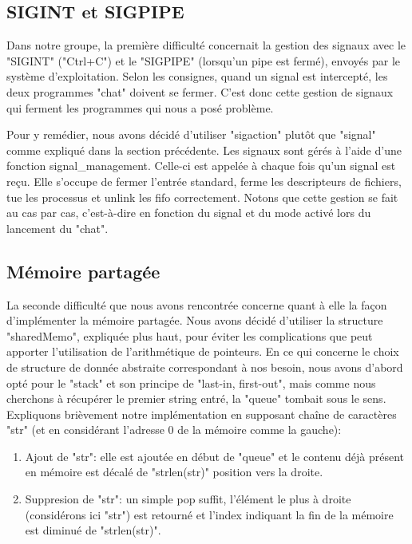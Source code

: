 \documentclass[utf8]{article}
\begin{document}
\subsection{SIGINT et SIGPIPE}
Dans notre groupe, la première difficulté concernait la gestion des signaux avec le "SIGINT" ("Ctrl+C") et le "SIGPIPE" 
(lorsqu'un pipe est fermé), envoyés par le système d'exploitation. Selon les consignes, quand un signal est intercepté, les deux programmes 
"chat" doivent se fermer. C'est donc cette gestion de signaux qui ferment les programmes qui nous a posé problème.

Pour y remédier, nous avons décidé d'utiliser "sigaction" plutôt que "signal" comme expliqué dans la section précédente.
Les signaux sont gérés à l'aide d'une fonction signal\_management. Celle-ci est appelée à chaque fois qu'un signal est reçu.
Elle s'occupe de fermer l'entrée standard, ferme les descripteurs de fichiers, tue les processus et unlink les fifo correctement. Notons
que cette gestion se fait au cas par cas, c'est-à-dire en fonction du signal et du mode activé lors du lancement du "chat".

\subsection{Mémoire partagée}
La seconde difficulté que nous avons rencontrée concerne quant à elle la façon d'implémenter la mémoire partagée. Nous avons décidé
d'utiliser la structure "sharedMemo", expliquée plus haut, pour éviter les complications que peut apporter l'utilisation de l'arithmétique de pointeurs. En ce qui
concerne le choix de structure de donnée abstraite correspondant à nos besoin, nous avons d'abord opté pour le "stack" et son principe de "last-in, first-out", 
mais comme nous cherchons à récupérer le premier string entré, la "queue" tombait sous le sens. Expliquons brièvement notre implémentation en supposant chaîne de
caractères "str" (et en considérant l'adresse 0 de la mémoire comme la gauche): 
\begin{enumerate}
    \item Ajout de "str": elle est ajoutée en début de "queue" et le contenu déjà présent en mémoire est décalé de "strlen(str)" position vers la droite.
    \item Suppresion de "str": un simple pop suffit, l'élément le plus à droite (considérons ici "str") est retourné et l'index indiquant la fin de la mémoire 
          est diminué de "strlen(str)".
\end{enumerate}
\end{document}
